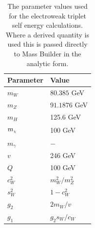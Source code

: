 \documentclass[11pt]{article}
\newcommand{\mychi}{\raisebox{0pt}[1ex][1ex]{\tiny$\chi$}}
\def\mc{m_{\mychi}}
\newcommand{\mb}{\textsf{Mass Builder} }
\begin{document}
\begin{table}[h!]
\caption{The parameter values used for the electroweak triplet self energy calculations.  Where a derived quantity is used this is passed directly to \mb in the analytic form.}\label{table:input_params}
\centering
\vspace{0.5cm}
\begin{tabular}{l l}
\hline
Parameter & Value\\
\hline
$m_W$ & $80.385$ GeV \\
$m_Z$ & $91.1876$ GeV \\
$m_H$ & 125.6 GeV\\
$\mc$ & 100 GeV\\
$m_{\gamma}$ & $-$ \\
$v$ & 246 GeV \\
$Q$ & 100 GeV \\
$c_W^2$ & $m^2_W/m^2_Z$ \\
$s_W^2$ & $1-c^2_W$ \\
$g_2$ & $2m_W/v$\\
$g_1$ & $g_2 s_W/c_W$\\
\hline\end{tabular}
\end{table}
\end{document}
